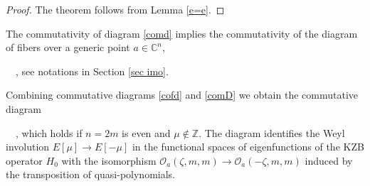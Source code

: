 \documentclass[12pt]{amsart}
\numberwithin{equation}{section}
\theoremstyle{definition}
\let\mc\mathcal
\def\C{{\mathbb C}}
\def\Z{{\mathbb Z}}
\def\B{{\mc B}}
\def\O{{\mc O}}
\def\O{{\mc O}}
\begin{document}
\begin{proof}
The theorem follows from Lemma \ref{e=e}.
\end{proof}

The commutativity of diagram \eqref{comd} implies the commutativity of the 
diagram of fibers over a generic point $a\in\C^n$,
\bean
\label{cofd}
  \ \ ,
\eean
see notations in Section \ref{sec imo}. 

Combining commutative diagrams \eqref{cofd} and \eqref{comD} we obtain the commutative
diagram
\bean
\label{cofd}
  \ \ ,
\eean
which holds if $n=2m$ is even and $\mu\notin\Z$. The diagram 
identifies the Weyl involution $E[\mu]\to E[-\mu]$ in the functional spaces
of eigenfunctions of the KZB operator $H_0$ 
with the isomorphism $\O_a(\zeta, m,m)\to \O_a(-\zeta, m,m)$
induced by the transposition  of quasi-polynomials.
\end{document}
